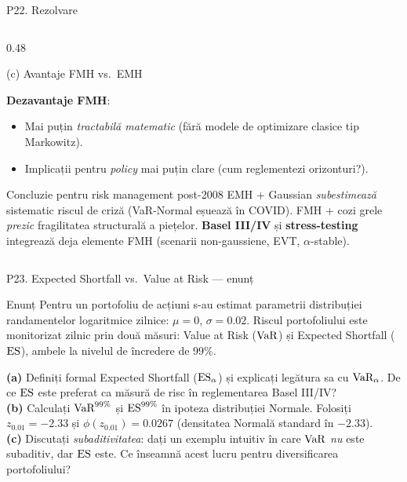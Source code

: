 \documentclass[9pt, aspectratio=169, t]{beamer}
\begin{document}
\begin{frame}[shrink=25]{P22. Rezolvare}
\begin{columns}[T]
\begin{column}{0.48\textwidth}
\begin{block}{(c) Avantaje FMH vs.\ EMH}
\begin{itemize}
\end{itemize}
\textbf{Dezavantaje FMH}:
\begin{itemize}\setlength{\itemsep}{0pt}
    \item Mai puțin \emph{tractabilă matematic} (fără modele de optimizare clasice tip Markowitz).
    \item Implicații pentru \emph{policy} mai puțin clare (cum reglementezi orizonturi?).
\end{itemize}
\end{block}
\begin{alertblock}{Concluzie pentru risk management post-2008}
EMH + Gaussian \emph{subestimează} sistematic riscul de criză (VaR-Normal eșuează în COVID). FMH + cozi grele \emph{prezic} fragilitatea structurală a piețelor. \textbf{Basel III/IV} și \textbf{stress-testing} integrează deja elemente FMH (scenarii non-gaussiene, EVT, $\alpha$-stable).
\end{alertblock}
\end{column}
\end{columns}
\end{frame}

\begin{frame}{P23. Expected Shortfall vs.\ Value at Risk --- enunț}
\begin{block}{Enunț}
Pentru un portofoliu de acțiuni s-au estimat parametrii distribuției randamentelor logaritmice zilnice: $\mu = 0$, $\sigma = 0.02$. Riscul portofoliului este monitorizat zilnic prin două măsuri: Value at Risk ($\text{VaR}$) și Expected Shortfall ($\text{ES}$), ambele la nivelul de încredere de 99\%.

\textbf{(a)} Definiți formal Expected Shortfall ($\text{ES}_\alpha$) și explicați legătura sa cu $\text{VaR}_\alpha$. De ce $\text{ES}$ este preferat ca măsură de risc în reglementarea Basel III/IV?\\
\textbf{(b)} Calculați $\text{VaR}^{99\%}$ și $\text{ES}^{99\%}$ în ipoteza distribuției Normale. Folosiți $z_{0.01} = -2.33$ și $\phi(z_{0.01}) = 0.0267$ (densitatea Normală standard în $-2.33$).\\
\textbf{(c)} Discutați \emph{subaditivitatea}: dați un exemplu intuitiv în care $\text{VaR}$ \emph{nu} este subaditiv, dar $\text{ES}$ este. Ce înseamnă acest lucru pentru diversificarea portofoliului?
\end{block}
\end{frame}
\end{document}
